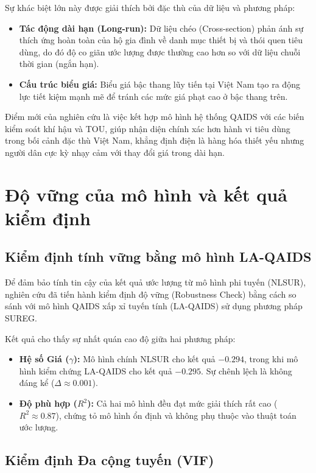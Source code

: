\documentclass[12pt,a4paper,oneside]{article}
\begin{document}
	Sự khác biệt lớn này được giải thích bởi đặc thù của dữ liệu và phương pháp:
	\begin{itemize}
		\item \textbf{Tác động dài hạn (Long-run):} Dữ liệu chéo (Cross-section) phản ánh sự thích ứng hoàn toàn của hộ gia đình về danh mục thiết bị và thói quen tiêu dùng, do đó độ co giãn ước lượng được thường cao hơn so với dữ liệu chuỗi thời gian (ngắn hạn).
		\item \textbf{Cấu trúc biểu giá:} Biểu giá bậc thang lũy tiến tại Việt Nam tạo ra động lực tiết kiệm mạnh mẽ để tránh các mức giá phạt cao ở bậc thang trên.
	\end{itemize}
	Điểm mới của nghiên cứu là việc kết hợp mô hình hệ thống QAIDS với các biến kiểm soát khí hậu và TOU, giúp nhận diện chính xác hơn hành vi tiêu dùng trong bối cảnh đặc thù Việt Nam, khẳng định điện là hàng hóa thiết yếu nhưng người dân cực kỳ nhạy cảm với thay đổi giá trong dài hạn.
	
\section{Độ vững của mô hình và kết quả kiểm định}

\subsection{Kiểm định tính vững bằng mô hình LA-QAIDS}
Để đảm bảo tính tin cậy của kết quả ước lượng từ mô hình phi tuyến (NLSUR), nghiên cứu đã tiến hành kiểm định độ vững (Robustness Check) bằng cách so sánh với mô hình QAIDS xấp xỉ tuyến tính (LA-QAIDS) sử dụng phương pháp SUREG.

Kết quả cho thấy sự nhất quán cao độ giữa hai phương pháp:
\begin{itemize}
	\item \textbf{Hệ số Giá ($\gamma$):} Mô hình chính NLSUR cho kết quả $-0.294$, trong khi mô hình kiểm chứng LA-QAIDS cho kết quả $-0.295$. Sự chênh lệch là không đáng kể ($\Delta \approx 0.001$).
	\item \textbf{Độ phù hợp ($R^2$):} Cả hai mô hình đều đạt mức giải thích rất cao ($R^2 \approx 0.87$), chứng tỏ mô hình ổn định và không phụ thuộc vào thuật toán ước lượng.
\end{itemize}

\subsection{Kiểm định Đa cộng tuyến (VIF)}
\end{document}
